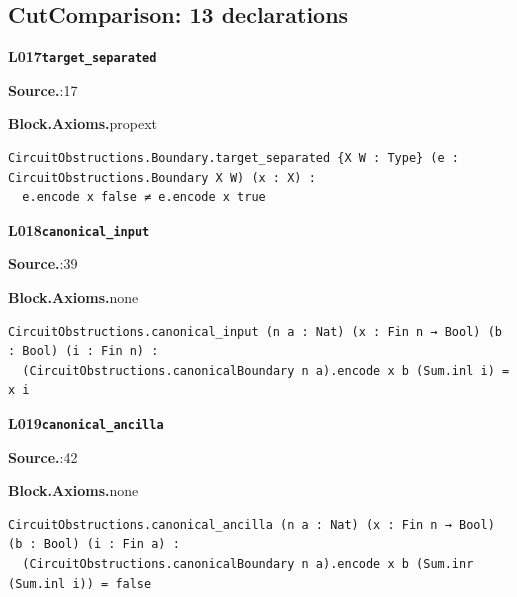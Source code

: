 \subsection*{CutComparison: 13 declarations}
\par\medskip\noindent\begin{minipage}{\textwidth}
{\small\bfseries L017\enspace\texttt{target\_separated}\par}
{\footnotesize\raggedright\textbf{Source.}\enspace{}:17\par
\textbf{Block.}\quad\textbf{Axioms.}\enspace propext\par}\nopagebreak
\begin{lstlisting}
CircuitObstructions.Boundary.target_separated {X W : Type} (e : CircuitObstructions.Boundary X W) (x : X) :
  e.encode x false ≠ e.encode x true
\end{lstlisting}
\end{minipage}\par

\par\medskip\noindent\begin{minipage}{\textwidth}
{\small\bfseries L018\enspace\texttt{canonical\_input}\par}
{\footnotesize\raggedright\textbf{Source.}\enspace{}:39\par
\textbf{Block.}\quad\textbf{Axioms.}\enspace none\par}\nopagebreak
\begin{lstlisting}
CircuitObstructions.canonical_input (n a : Nat) (x : Fin n → Bool) (b : Bool) (i : Fin n) :
  (CircuitObstructions.canonicalBoundary n a).encode x b (Sum.inl i) = x i
\end{lstlisting}
\end{minipage}\par

\par\medskip\noindent\begin{minipage}{\textwidth}
{\small\bfseries L019\enspace\texttt{canonical\_ancilla}\par}
{\footnotesize\raggedright\textbf{Source.}\enspace{}:42\par
\textbf{Block.}\quad\textbf{Axioms.}\enspace none\par}\nopagebreak
\begin{lstlisting}
CircuitObstructions.canonical_ancilla (n a : Nat) (x : Fin n → Bool) (b : Bool) (i : Fin a) :
  (CircuitObstructions.canonicalBoundary n a).encode x b (Sum.inr (Sum.inl i)) = false
\end{lstlisting}
\end{minipage}\par

